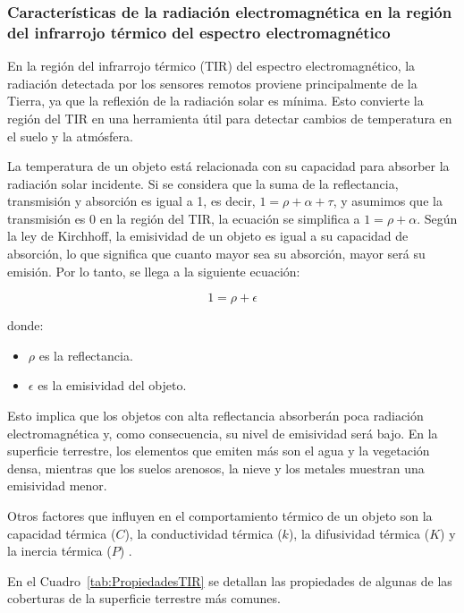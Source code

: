 \subsubsection{Características de la radiación electromagnética en la región del infrarrojo térmico del espectro electromagnético}

En la región del infrarrojo térmico (TIR) del espectro electromagnético, la radiación detectada por los sensores remotos proviene principalmente de la Tierra, ya que la reflexión de la radiación solar es mínima. Esto convierte la región del TIR en una herramienta útil para detectar cambios de temperatura en el suelo y la atmósfera.

La temperatura de un objeto está relacionada con su capacidad para absorber la radiación solar incidente. Si se considera que la suma de la reflectancia, transmisión y absorción es igual a 1, es decir, $1=\rho+\alpha+\tau$, y asumimos que la transmisión es $0$ en la región del TIR, la ecuación se simplifica a $1=\rho+\alpha$. Según la ley de Kirchhoff, la emisividad de un objeto es igual a su capacidad de absorción, lo que significa que cuanto mayor sea su absorción, mayor será su emisión. Por lo tanto, se llega a la siguiente ecuación:

\begin{equation}
    1=\rho+\epsilon
\end{equation}

donde:
\begin{itemize}
    \item $\rho$ es la reflectancia.
    \item $\epsilon$ es la emisividad del objeto.
\end{itemize}

Esto implica que los objetos con alta reflectancia absorberán poca radiación electromagnética y, como consecuencia, su nivel de emisividad será bajo. En la superficie terrestre, los elementos que emiten más son el agua y la vegetación densa, mientras que los suelos arenosos, la nieve y los metales muestran una emisividad menor.

Otros factores que influyen en el comportamiento térmico de un objeto son la capacidad térmica ($C$), la conductividad térmica ($k$), la difusividad térmica ($K$) y la inercia térmica ($P$) \cite{chuvieco2016fundamentals}.

En el Cuadro~\ref{tab:PropiedadesTIR} se detallan las propiedades de algunas de las coberturas de la superficie terrestre más comunes.


